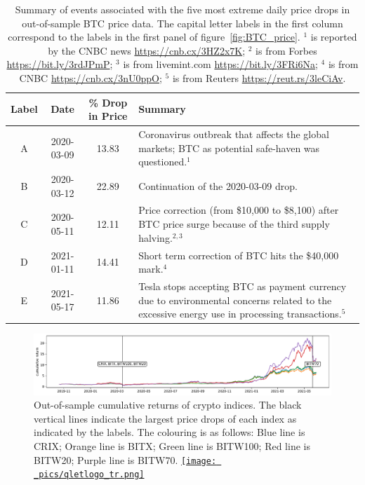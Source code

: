 \documentclass[11pt,a4paper,english]{article}
\begin{document}
\begin{table}[!h]
    \centering
      \begin{tabularx}{.8\textwidth}{cccX}
        \toprule
        Label &   Date & \% Drop in Price &  Summary\\
        \midrule
        A &  2020-03-09 & 13.83 &  Coronavirus outbreak that affects
        the global markets; BTC as potential safe-haven was
        questioned.$^1$\\ 
        B &  2020-03-12 & 22.89 &  Continuation of the 2020-03-09
        drop.  \\ 
        C &  2020-05-11 & 12.11 &  Price correction (from \$10,000 to
        \$8,100) after BTC price surge because of the third supply
        halving.$^{2,3}$ \\ 
        D &  2021-01-11 & 14.41 &  Short term correction of BTC hits
        the \$40,000 mark.$^4$\\ 
        E &  2021-05-17 & 11.86 &  Tesla stops accepting BTC as
        payment currency due to environmental concerns related to the
        excessive energy use in processing transactions.$^5$\\ 
        \bottomrule
      \end{tabularx}
        \caption{Summary of events associated with the five most
          extreme daily price drops in out-of-sample BTC price data. 
        The capital letter labels in the first column correspond to
        the labels in the first panel of figure~\ref{fig:BTC_price}. 
        $^1$ is reported by the CNBC news \url{https://cnb.cx/3HZ2x7K}; $^2$ is from Forbes \url{https://bit.ly/3rdJPmP};
        $^3$ is from livemint.com \url{https://bit.ly/3FRi6Na};
        $^4$ is from CNBC \url{https://cnb.cx/3nU0ppO};
        $^5$ is from Reuters \url{https://reut.rs/3leCiAv}.
        }
        \label{tab:BTC_5min}
  \end{table}
\clearpage
\newpage

\begin{figure}[t]
\includegraphics[width=\textwidth]{_pics/index_price.pdf}
  \caption{Out-of-sample cumulative returns of crypto indices. 
  The black vertical lines indicate the largest price drops of each
  index as indicated by the labels.
  The colouring is as follows:
  \textcolor{plt1}{Blue line} is CRIX;
  \textcolor{plt2}{Orange line} is BITX;
  \textcolor{plt3}{Green line} is BITW100;
  \textcolor{plt4}{Red line} is BITW20;
  \textcolor{plt5}{Purple line} is BITW70.
  \href{https://github.com/QuantLet/Hedging-Cryptos-with-Bitcoin-Futures/blob/main/newToQuantlet/Pynotebooks/figures/Figure 3_4_5.ipynb}{\texttt{[image: \_pics/qletlogo\_tr.png]}} }
  \label{fig:index_price}
\end{figure}
\end{document}
